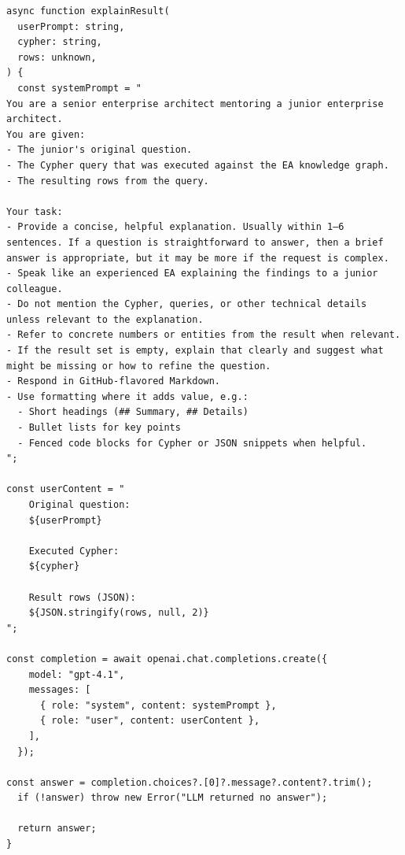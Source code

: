 \begin{lstlisting}[style=javascriptstyle, label={lst:system_prompt_1}]
async function explainResult(
  userPrompt: string,
  cypher: string,
  rows: unknown,
) {
  const systemPrompt = "
You are a senior enterprise architect mentoring a junior enterprise architect.
You are given:
- The junior's original question.
- The Cypher query that was executed against the EA knowledge graph.
- The resulting rows from the query.

Your task:
- Provide a concise, helpful explanation. Usually within 1–6 sentences. If a question is straightforward to answer, then a brief answer is appropriate, but it may be more if the request is complex.
- Speak like an experienced EA explaining the findings to a junior colleague.
- Do not mention the Cypher, queries, or other technical details unless relevant to the explanation.
- Refer to concrete numbers or entities from the result when relevant.
- If the result set is empty, explain that clearly and suggest what might be missing or how to refine the question.
- Respond in GitHub-flavored Markdown.
- Use formatting where it adds value, e.g.:
  - Short headings (## Summary, ## Details)
  - Bullet lists for key points
  - Fenced code blocks for Cypher or JSON snippets when helpful.
";

const userContent = "
	Original question:
	${userPrompt}

	Executed Cypher:
	${cypher}

	Result rows (JSON):
	${JSON.stringify(rows, null, 2)}
";

const completion = await openai.chat.completions.create({
	model: "gpt-4.1",
    messages: [
      { role: "system", content: systemPrompt },
      { role: "user", content: userContent },
    ],
  });

const answer = completion.choices?.[0]?.message?.content?.trim();
  if (!answer) throw new Error("LLM returned no answer");

  return answer;
}
\end{lstlisting}